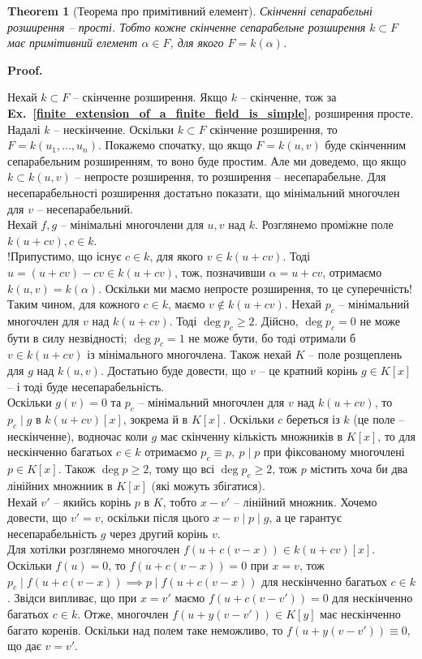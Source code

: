 \documentclass[a4paper, 10pt]{article}
\makeatletter
\theoremstyle{theoremdd}
\newtheorem{theorem}{Theorem}[subsection]
\theoremstyle{theoremdd}
\theoremstyle{theoremdd}
\theoremstyle{theoremdd}
\theoremstyle{theoremdd}
\theoremstyle{theoremdd}
\theoremstyle{theoremdd}
\theoremstyle{theoremdd}
\theoremstyle{theoremdd}
\theoremstyle{theoremdd}
\theoremstyle{theoremdd}
\theoremstyle{theoremdd}
\theoremstyle{theoremdd}
\theoremstyle{theoremdd}
\theoremstyle{theoremdd}
\renewenvironment{proof}[1][Proof.\\]{\par
\pushQED{\hfill \qed}%
\normalfont \topsep6\p@\@plus6\p@\relax
\trivlist
\item\relax
{\bfseries
#1\@addpunct{.}}\hspace\labelsep\ignorespaces
}{%
\popQED\endtrivlist\@endpefalse
}
\newcommand\exref[1]{\textbf{Ex.~\ref{#1}}}
\makeatother
\begin{document}
\begin{theorem}[Теорема про примітивний елемент]
Скінченні сепарабельні розширення -- прості. Тобто кожне скінченне сепарабельне розширення $k \subset F$ має примітивний елемент $\alpha \in F$, для якого $F = k(\alpha)$.
\end{theorem}

\begin{proof}
Нехай $k \subset F$ -- скінченне розширення. Якщо $k$ -- скінченне, тож за \exref{finite_extension_of_a_finite_field_is_simple}, розширення просте.\\
Надалі $k$ -- нескінченне. Оскільки $k \subset F$ скінченне розширення, то $F = k(u_1,\dots,u_n)$. Покажемо спочатку, що якщо $F = k(u,v)$ буде скінченним сепарабельним розширенням, то воно буде простим. Але ми доведемо, що якщо $k \subset k(u,v)$ -- непросте розширення, то розширення -- несепарабельне. Для несепарабельності розширення достатьно показати, що мінімальний многочлен для $v$ -- несепарабельний.\\
Нехай $f,g$ -- мінімальні многочлени для $u,v$ над $k$. Розглянемо проміжне поле $k(u+cv), c \in k$.\\
!Припустимо, що існує $c \in k$, для якого $v \in k(u+cv)$. Тоді $u = (u+cv)-cv \in k(u+cv)$, тож, позначивши $\alpha = u + cv$, отримаємо $k(u,v) = k(\alpha)$. Оскільки ми маємо непросте розширення, то це суперечність!\\
Таким чином, для кожного $c \in k$, маємо $v \notin k(u+cv)$. Нехай $p_c$ -- мінімальний многочлен для $v$ над $k(u+cv)$. Тоді $\deg p_c \geq 2$. Дійсно, $\deg p_c = 0$ не може бути в силу незвідності; $\deg p_c = 1$ не може бути, бо тоді отримали б $v \in k(u+cv)$ із мінімального многочлена. Також нехай $K$ -- поле розщеплень для $g$ над $k(u,v)$. Достатьно буде довести, що $v$ -- це кратний корінь $g \in K[x]$ -- і тоді буде несепарабельність.\\
Оскільки $g(v) = 0$ та $p_c$ -- мінімальний многочлен для $v$ над $k(u+cv)$, то $p_c \mid g$ в $k(u+cv)[x]$, зокрема й в $K[x]$. Оскільки $c$ береться із $k$ (це поле -- нескінченне), водночас коли $g$ має скінченну кількість множників в $K[x]$, то для нескінченно багатьох $c \in k$ отримаємо $p_c \equiv p,\ p \mid p$ при фіксованому многочлені $p \in K[x]$. Також $\deg p \geq 2$, тому що всі $\deg p_c \geq 2$, тож $p$ містить хоча би два лінійних множниик в $K[x]$ (які можуть збігатися).\\
Нехай $v'$ -- якийсь корінь $p$ в $K$, тобто $x-v'$ -- лінійний множник. Хочемо довести, що $v' = v$, оскільки після цього $x-v \mid p \mid g$, а це гарантує несепарабельність $g$ через другий корінь $v$.\\
Для хотілки розглянемо многочлен $f(u+c(v-x)) \in k(u+cv)[x]$. Оскільки $f(u) = 0$, то $f(u+c(v-x)) = 0$ при $x = v$, тож $p_c \mid f(u+c(v-x)) \implies p \mid f(u+c(v-x))$ для нескінченно багатьох $c \in k$. Звідси випливає, що при $x = v'$ маємо $f(u+c(v-v')) = 0$ для нескінченно багатьох $c \in k$. Отже, многочлен $f(u+y(v-v')) \in K[y]$ має нескінченно багато коренів. Оскільки над полем таке неможливо, то $f(u+y(v-v')) \equiv 0$, що дає $v = v'$.
\end{proof}
\end{document}
